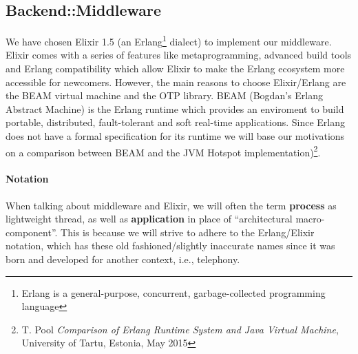 \subsection{Backend::Middleware}
We have chosen Elixir 1.5 (an Erlang\footnote{Erlang is a general-purpose,
concurrent, garbage-collected programming language} dialect) to implement
our middleware. Elixir comes with a series of features like metaprogramming,
advanced build tools and Erlang compatibility which allow Elixir to make the
Erlang ecosystem more accessible for newcomers.
However, the main reasons to choose Elixir/Erlang are the BEAM virtual machine
and the OTP library.
BEAM (Bogdan's Erlang Abstract Machine) is the Erlang runtime which provides an
enviroment to build portable, distributed, fault-tolerant and soft real-time
applications.
Since Erlang does not have a formal specification for its runtime we will
base our motivations on a comparison between BEAM and the JVM Hotspot
implementation)\footnote{T. Pool \textit{Comparison of Erlang Runtime System
and Java Virtual Machine}, University of Tartu, Estonia, May 2015}.

\paragraph{Notation}
When talking about middleware and Elixir, we will often the term
\textbf{process} as lightweight thread, as well as \textbf{application} in place
of ``architectural macro-component''. This is because we will strive to adhere
to the Erlang/Elixir notation, which has these old fashioned/slightly inaccurate
names since it was born and developed for another context, i.e., telephony.

